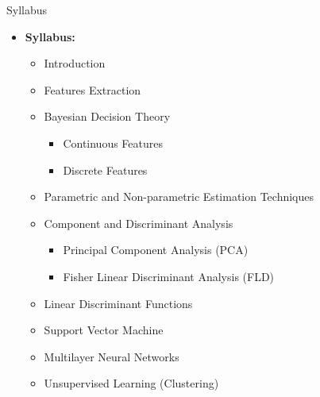 \begin{frame}{Syllabus}
\begin{itemize}

\item \textbf{Syllabus:} 
\begin{itemize}
\item Introduction
\item Features Extraction
\item Bayesian Decision Theory
\begin{itemize}
\item Continuous Features
\item Discrete Features
\end{itemize}
\item Parametric and Non-parametric Estimation Techniques
\item Component and Discriminant Analysis
\begin{itemize}
\item Principal Component Analysis (PCA)
\item Fisher Linear Discriminant Analysis (FLD)
\end{itemize}
\item Linear Discriminant Functions 
\item Support Vector Machine
\item Multilayer Neural Networks
\item Unsupervised Learning (Clustering)
\end{itemize}
\end{itemize}
\end{frame}

